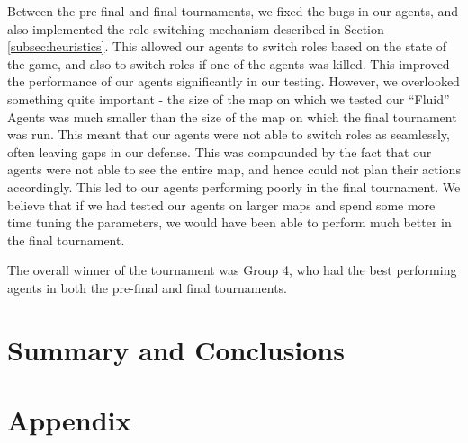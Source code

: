 \documentclass[a4paper,12pt]{article}
\begin{document}
Between the pre-final and final tournaments, we fixed the bugs in our agents, and also implemented the role switching mechanism described in Section \ref{subsec:heuristics}. This allowed our agents to switch roles based on the state of the game, and also to switch roles if one of the agents was killed. This improved the performance of our agents significantly in our testing. However, we overlooked something quite important - the size of the map on which we tested our ``Fluid'' Agents was much smaller than the size of the map on which the final tournament was run. This meant that our agents were not able to switch roles as seamlessly, often leaving gaps in our defense. This was compounded by the fact that our agents were not able to see the entire map, and hence could not plan their actions accordingly. This led to our agents performing poorly in the final tournament. We believe that if we had tested our agents on larger maps and spend some more time tuning the parameters, we would have been able to perform much better in the final tournament.

The overall winner of the tournament was Group 4, who had the best performing agents in both the pre-final and final tournaments.







\section{Summary and Conclusions}
\label{sec:conclusion}












\printbibliography

\newpage

\appendix
\section{Appendix}
\label{sec:appendix}
\end{document}
